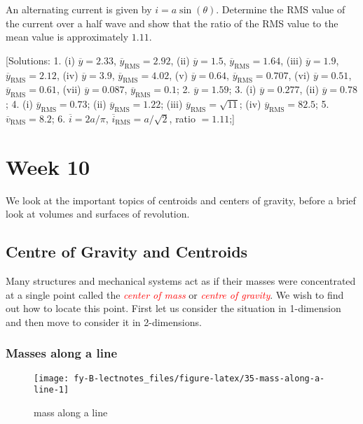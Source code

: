 \documentclass[
  11pt,
  oneside]{book}
\newcommand{\slide}{}
\theoremstyle{definition}
\theoremstyle{definition}
\theoremstyle{definition}
\theoremstyle{definition}
\theoremstyle{remark}
\begin{document}
An alternating current is given by \(i = a\sin(\theta)\). Determine the RMS value of the current over a half wave and show that the ratio of the RMS value to the mean value is approximately \(1.11\).

{[}Solutions:
1. (i) \(\overline{y}=2.33\), \(\overline{y}_{\text{RMS}}=2.92\), (ii) \(\overline{y}=1.5\), \(\overline{y}_{\text{RMS}}=1.64\), (iii) \(\overline{y}=1.9\), \(\overline{y}_{\text{RMS}}=2.12\), (iv) \(\overline{y}=3.9\), \(\overline{y}_{\text{RMS}}=4.02\), (v) \(\overline{y}=0.64\), \(\overline{y}_{\text{RMS}}=0.707\), (vi) \(\overline{y}=0.51\), \(\overline{y}_{\text{RMS}}=0.61\), (vii) \(\overline{y}=0.087\), \(\overline{y}_{\text{RMS}}=0.1\);
2. \(\overline{y}=1.59\);
3. (i) \(\overline{y}=0.277\), (ii) \(\overline{y}=0.78\);
4. (i) \(\overline{y}_{\text{RMS}}=0.73\); (ii) \(\overline{y}_{\text{RMS}}=1.22\); (iii) \(\overline{y}_{\text{RMS}}=\sqrt{11}\); (iv) \(\overline{y}_{\text{RMS}}=82.5\);
5. \(\overline{v}_{\text{RMS}}=8.2\);
6. \(\overline{i}=2a/\pi\), \(\overline{i}_{\text{RMS}}=a/\sqrt{2}\), ratio \(=1.11\);{]}

\chapter{Week 10}\label{week-ten}

We look at the important topics of centroids and centers of gravity, before a brief look at volumes and surfaces of revolution.

\slide

\section{Centre of Gravity and Centroids}\label{centre-of-gravity-and-centroids}

Many structures and mechanical systems act as if their masses were concentrated at a single point called the \textcolor{red}{\em center of mass} or \textcolor{red}{\em centre of gravity}. We wish to find out how to locate this point. First let us consider the situation in 1-dimension and then move to consider it in 2-dimensions.

\slide

\subsection{Masses along a line}\label{masses-along-a-line}

\begin{figure}

{\centering \texttt{[image: fy-B-lectnotes\_files/figure-latex/35-mass-along-a-line-1]} 

}

\caption{mass along a line}\label{fig:35-mass-along-a-line}
\end{figure}
\end{document}
